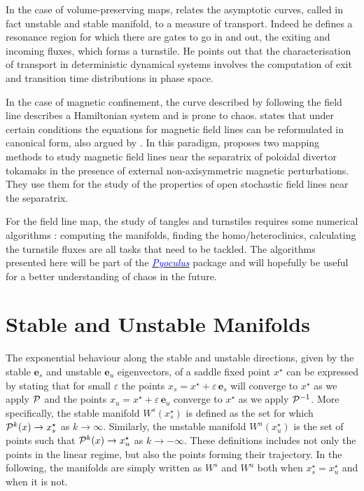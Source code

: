In the case of volume-preserving maps, \cite{meiss_thirty_2015} relates the asymptotic curves, called in fact unstable and stable manifold, to a measure of transport. Indeed he defines a resonance region for which there are gates to go in and out, the exiting and incoming fluxes, which forms a turnstile. He points out that the characterisation of transport in deterministic dynamical systems involves the computation of exit and transition time distributions in phase space.

In the case of magnetic confinement, the curve described by following the field line describes a Hamiltonian system and is prone to chaos. \cite{viana_hamiltonian_2023} states that under certain conditions the equations for magnetic field lines can be reformulated in canonical form, also argued by \cite{escande_description_2024}. In this paradigm, \cite{abdullaev_magnetic_2014} proposes two mapping methods to study magnetic field lines near the separatrix of poloidal divertor tokamaks in the presence of external non-axisymmetric magnetic perturbations. They use them for the study of the properties of open stochastic field lines near the separatrix. 

For the field line map, the study of tangles and turnstiles requires some numerical algorithms : computing the manifolds, finding the homo/heteroclinics, calculating the turnstile fluxes are all tasks that need to be tackled. The algorithms presented here will be part of the \href{https://github.com/zhisong/pyoculus}{\textcolor{blue}{\textit{Pyoculus}}} package and will hopefully be useful for a better understanding of chaos in the future.

\section{Stable and Unstable Manifolds}\label{sec:manif}

The exponential behaviour along the stable and unstable directions, given by the stable $\textbf{e}_s$ and unstable $\textbf{e}_u$ eigenvectors, of a saddle fixed point $x^\star$ can be expressed by stating that for small $\varepsilon$ the points $x_s = x^\star + \varepsilon\,\textbf{e}_s$ will converge to $x^\star$ as we apply $\mathcal{P}$ and the points $x_u = x^\star + \varepsilon\,\textbf{e}_u$ converge to $x^\star$ as we apply $\mathcal{P}^{-1}$. More specifically, the stable manifold $W^s(x_s^\star)$ is defined as the set for which $\mathcal{P}^k(x)\to x_s^\star$ as $k\to\infty$. Similarly, the unstable manifold $W^u(x_u^\star)$ is the set of points such that $\mathcal{P}^k(x)\to x_u^\star$ as $k\to -\infty$. These definitions includes not only the points in the linear regime, but also the points forming their trajectory. In the following, the manifolds are simply written as $W^s$ and $W^u$ both when $x_s^\star = x_u^\star$ and when it is not.

